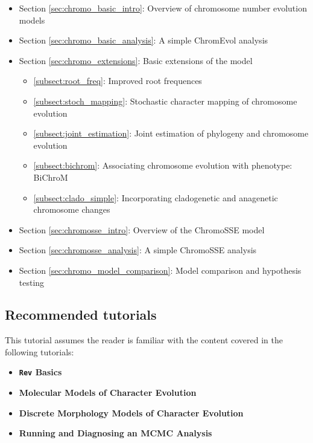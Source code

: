 \begin{itemize}
\item Section \ref{sec:chromo_basic_intro}: Overview of chromosome number evolution models
\item Section \ref{sec:chromo_basic_analysis}: A simple ChromEvol analysis
\item Section \ref{sec:chromo_extensions}: Basic extensions of the model
    \begin{itemize}
    \item \ref{subsect:root_freq}: Improved root frequences
    \item \ref{subsect:stoch_mapping}: Stochastic character mapping of chromosome evolution
    \item \ref{subsect:joint_estimation}: Joint estimation of phylogeny and chromosome evolution
    \item \ref{subsect:bichrom}: Associating chromosome evolution with phenotype: BiChroM
    \item \ref{subsect:clado_simple}: Incorporating cladogenetic and anagenetic chromosome changes
    \end{itemize}
\item Section \ref{sec:chromosse_intro}: Overview of the ChromoSSE model
\item Section \ref{sec:chromosse_analysis}: A simple ChromoSSE analysis
\item Section \ref{sec:chromo_model_comparison}: Model comparison and hypothesis testing 
\end{itemize}

\subsection*{Recommended tutorials}

This tutorial assumes the reader is familiar with the content covered in the following \RevBayes tutorials:

\begin{itemize}
\item {\bf {\tt \large Rev} Basics}
\item {\bf Molecular Models of Character Evolution}
\item {\bf Discrete Morphology Models of Character Evolution}
\item {\bf Running and Diagnosing an MCMC Analysis}
\end{itemize}

\newpage
